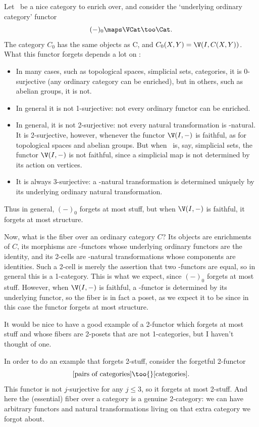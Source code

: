 \documentclass[12pt]{amsart}
\begin{document}
\begin{eg}
  Let \V\ be a nice category to enrich over, and consider the
  `underlying ordinary category' functor
  \[(-)_0\maps \VCat \too \Cat.\]
  The category $C_0$ has the same objects as C, and $C_0(X,Y) =
  \V(I,C(X,Y))$.  What this functor forgets depends a lot on \V:
  \begin{itemize}
  \item In many cases, such as topological spaces, simplicial sets,
    categories, it is 0-surjective (any ordinary category can be
    enriched), but in others, such as abelian groups, it is not.
  \item In general it is not 1-surjective: not every ordinary functor
    can be enriched.
  \item In general, it is not 2-surjective: not every natural
    transformation is \V-natural.  It is 2-surjective, however,
    whenever the functor $\V(I,-)$ is faithful, as for topological
    spaces and abelian groups.  But when \V\ is, say, simplicial sets,
    the functor $\V(I,-)$ is not faithful, since a simplicial map is
    not determined by its action on vertices.
  \item It is always 3-surjective: a \V-natural transformation is
    determined uniquely by its underlying ordinary natural
    transformation.
  \end{itemize}
  Thus in general, $(-)_0$ forgets at most stuff, but when $\V(I,-)$
  is faithful, it forgets at most structure.

  Now, what is the fiber over an ordinary category $C$?  Its objects
  are enrichments of $C$, its morphisms are \V-functors whose
  underlying ordinary functors are the identity, and its 2-cells are
  \V-natural transformations whose components are identities.  Such a
  2-cell is merely the assertion that two \V-functors are equal, so in
  general this is a 1-category.  This is what we expect, since $(-)_0$
  forgets at most stuff.  However, when $\V(I,-)$ is faithful, a
  \V-functor is determined by its underlying functor, so the fiber is
  in fact a poset, as we expect it to be since in this case the
  functor forgets at most structure.
\end{eg}

It would be nice to have a good example of a 2-functor which forgets
at most stuff and whose fibers are 2-posets that are not 1-categories,
but I haven't thought of one.

\begin{eg}
  In order to do an example that forgets 2-stuff, consider the
  forgetful 2-functor
  \[[\text{pairs of categories}]\too{} [\text{categories}].\]
  This functor is not $j$-surjective for any $j\le 3$, so it forgets
  at most 2-stuff.  And here the (essential) fiber over a category
  is a genuine 2-category: we can have arbitrary functors and natural
  transformations living on that extra category we forgot about.
\end{eg}
\end{document}
